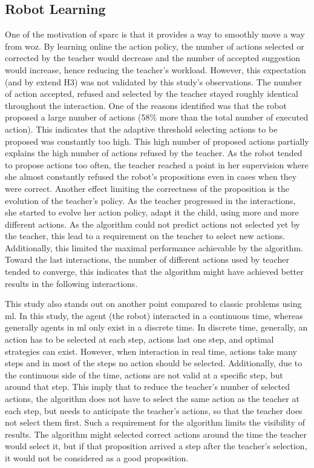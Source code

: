 \subsection{Robot Learning}

One of the motivation of \gls{sparc} is that it provides a way to smoothly move a way from \gls{woz}. By learning online the action policy, the number of actions selected or corrected by the teacher would decrease and the number of accepted suggestion would increase, hence reducing the teacher's workload. However, this expectation (and by extend H3) was not validated by this study's observations. The number of action accepted, refused and selected by the teacher stayed roughly identical throughout the interaction. One of the reasons identified was that the robot proposed a large number of actions (58\% more than the total number of executed action). This indicates that the adaptive threshold selecting actions to be proposed was constantly too high. This high number of proposed actions partially explains the high number of actions refused by the teacher. As the robot tended to propose actions too often, the teacher reached a point in her supervision where she almost constantly refused the robot's propositions even in cases when they were correct. Another effect limiting the correctness of the proposition is the evolution of the teacher's policy. As the teacher progressed in the interactions, she started to evolve her action policy, adapt it the child, using more and more different actions. As the algorithm could not predict actions not selected yet by the teacher, this lead to a requirement on the teacher to select new actions. Additionally, this limited the maximal performance achievable by the algorithm. Toward the last interactions, the number of different actions used by teacher tended to converge, this indicates that the algorithm might have achieved better results in the following interactions.

This study also stands out on another point compared to classic problems using \gls{ml}. In this study, the agent (the robot) interacted in a continuous time, whereas generally agents in \gls{ml} only exist in a discrete time. In discrete time, generally, an action has to be selected at each step, actions last one step, and optimal strategies can exist. However, when interaction in real time, actions take many steps and in most of the steps no action should be selected. Additionally, due to the continuous side of the time, actions are not valid at a specific step, but around that step. This imply that to reduce the teacher's number of selected actions, the algorithm does not have to select the same action as the teacher at each step, but needs to anticipate the teacher's actions, so that the teacher does not select them first. Such a requirement for the algorithm limits the visibility of results. The algorithm might selected correct actions around the time the teacher would select it, but if that proposition arrived a step after the teacher's selection, it would not be considered as a good proposition.

